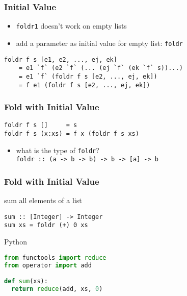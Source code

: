 \documentclass[dvipsnames]{beamer}
\theoremstyle{plain}
\begin{document}
\begin{frame}[fragile]
  \frametitle{Initial Value}

  \begin{itemize}
    \item \lstinline|foldr1| doesn't work on empty lists
    \item add a parameter as initial value for empty list:
      \lstinline|foldr|
  \end{itemize}

  \begin{block}{}
    \begin{lstlisting}
foldr f s [e1, e2, ..., ej, ek]
    = e1 `f` (e2 `f` (... (ej `f` (ek `f` s))...)
    = e1 `f` (foldr f s [e2, ..., ej, ek])
    = f e1 (foldr f s [e2, ..., ej, ek])
    \end{lstlisting}
  \end{block}
\end{frame}

\begin{frame}[fragile]
  \frametitle{Fold with Initial Value}

  \begin{exampleblock}{}
    \begin{lstlisting}[deletekeywords={foldr}]
foldr f s []     = s
foldr f s (x:xs) = f x (foldr f s xs)
    \end{lstlisting}

    \pause
    \medskip
    \begin{itemize}
      \item what is the type of \lstinline|foldr|?\\
        \lstinline|foldr :: (a -> b -> b) -> b -> [a] -> b|
    \end{itemize}
  \end{exampleblock}
\end{frame}

\begin{frame}[fragile]
  \frametitle{Fold with Initial Value}

  \begin{exampleblock}{sum all elements of a list}
    \begin{lstlisting}[deletekeywords={sum}]
sum :: [Integer] -> Integer
sum xs = foldr (+) 0 xs
    \end{lstlisting}
  \end{exampleblock}

  \bigskip
  \begin{exampleblock}{Python}
    \begin{lstlisting}[language=Python, deletekeywords={reduce, sum}]
from functools import reduce
from operator import add

def sum(xs):
  return reduce(add, xs, 0)
    \end{lstlisting}
  \end{exampleblock}
\end{frame}
\end{document}

